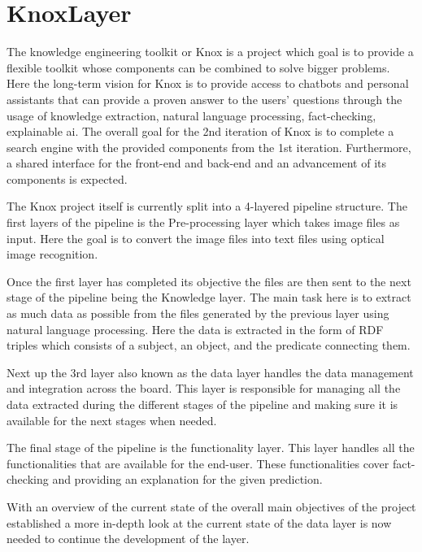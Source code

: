 \section{KnoxLayer}
The knowledge engineering toolkit or Knox is a project which goal is to provide a flexible toolkit whose components can be combined to solve bigger problems. Here the long-term vision for Knox is to provide access to chatbots and personal assistants that can provide a proven answer to the users' questions through the usage of knowledge extraction, natural language processing, fact-checking, explainable ai. 
The overall goal for the 2nd iteration of Knox is to complete a search engine with the provided components from the 1st iteration. Furthermore, a shared interface for the front-end and back-end and an advancement of its components is expected. 


The Knox project itself is currently split into a 4-layered pipeline structure. The first layers of the pipeline is the Pre-processing layer which takes image files as input. Here the goal is to convert the image files into text files using optical image recognition. 


Once the first layer has completed its objective the files are then sent to the next stage of the pipeline being the Knowledge layer. The main task here is to extract as much data as possible from the files generated by the previous layer using natural language processing. Here the data is extracted in the form of RDF triples which consists of a subject, an object, and the predicate connecting them. 


Next up the 3rd layer also known as the data layer handles the data management and integration across the board. This layer is responsible for managing all the data extracted during the different stages of the pipeline and making sure it is available for the next stages when needed. 


The final stage of the pipeline is the functionality layer. This layer handles all the functionalities that are available for the end-user. These functionalities cover fact-checking and providing an explanation for the given prediction.


With an overview of the current state of the overall main objectives of the project  established a more in-depth look at the current state of the data layer is now needed to continue the development of the layer. 


